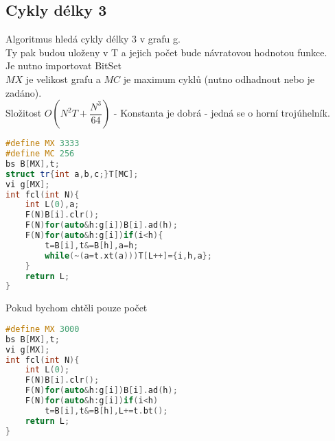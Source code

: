 \documentclass[11pt]{article}
\begin{document}
\subsection{Cykly délky 3}
Algoritmus hledá cykly délky 3 v grafu \textsf{g}.
\\Ty pak budou uloženy v \textsf{T} a jejich počet bude návratovou hodnotou funkce.
\\Je nutno importovat BitSet
\\$MX$ je velikost grafu a $MC$ je maximum cyklů (nutno odhadnout nebo je zadáno).
\\Složitost $O(N^2T+\dfrac{N^3}{64})$ - Konstanta je dobrá - jedná se o horní trojúhelník.
\begin{lstlisting}[language=C++]
#define MX 3333
#define MC 256
bs B[MX],t;
struct tr{int a,b,c;}T[MC];
vi g[MX];
int fcl(int N){
    int L(0),a;
    F(N)B[i].clr();
    F(N)for(auto&h:g[i])B[i].ad(h);
    F(N)for(auto&h:g[i])if(i<h){
        t=B[i],t&=B[h],a=h;
        while(~(a=t.xt(a)))T[L++]={i,h,a};
    }
    return L;
}
\end{lstlisting}
Pokud bychom chtěli pouze počet
\begin{lstlisting}[language=C++]
#define MX 3000
bs B[MX],t;
vi g[MX];
int fcl(int N){
    int L(0);
    F(N)B[i].clr();
    F(N)for(auto&h:g[i])B[i].ad(h);
    F(N)for(auto&h:g[i])if(i<h)
        t=B[i],t&=B[h],L+=t.bt();
    return L;
}
\end{lstlisting}
\end{document}
